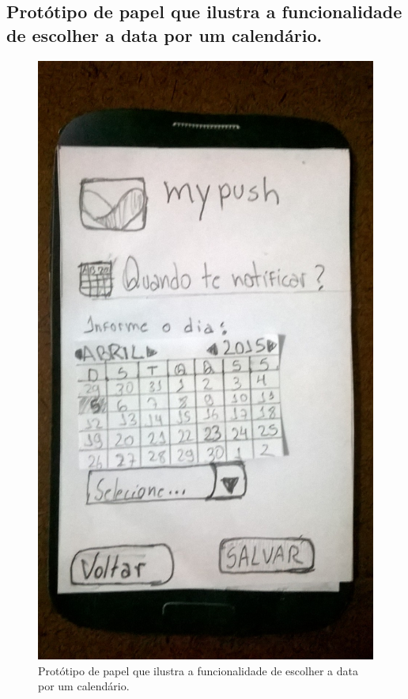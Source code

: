 \begin{anexosenv}
    \pagebreak
    \section*{Protótipo de papel que ilustra a funcionalidade de escolher a data por um calendário.}
    
      \begin{figure}[!htbp]
	\centering
	\includegraphics[scale=0.32, angle=-90]{editaveis/figuras/prototipo_papel_v1/quando_notificar_data}
	\caption{Protótipo de papel que ilustra a funcionalidade de escolher a data por um calendário.}
	\label{quando_notificar_data_v1}
      \end{figure}
    

\end{anexosenv}
